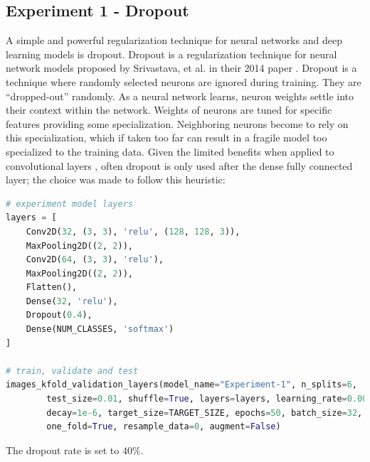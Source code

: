 \documentclass[11pt,a4paper]{article}
\begin{document}
\subsection{Experiment 1 - Dropout}
A simple and powerful regularization technique for neural networks and deep learning models is dropout. Dropout is a regularization technique for neural network models proposed by Srivastava, et al. in their 2014 paper \cite{JMLR:v15:srivastava14a}. Dropout is a technique where randomly selected neurons are ignored during training. They are “dropped-out” randomly. As a neural network learns, neuron weights settle into their context within the network. Weights of neurons are tuned for specific features providing some specialization. Neighboring neurons become to rely on this specialization, which if taken too far can result in a fragile model too specialized to the training data. Given the limited benefits when applied to convolutional layers \cite{DBLP:journals/corr/abs-1810-12890}, often dropout is only used after the dense fully connected layer; the choice was made to follow this heuristic:
\begin{lstlisting}[language=Python,frame=single]
# experiment model layers
layers = [
    Conv2D(32, (3, 3), 'relu', (128, 128, 3)),
    MaxPooling2D((2, 2)),
    Conv2D(64, (3, 3), 'relu'),
    MaxPooling2D((2, 2)),
    Flatten(),
    Dense(32, 'relu'),
    Dropout(0.4),
    Dense(NUM_CLASSES, 'softmax')
]

# train, validate and test
images_kfold_validation_layers(model_name="Experiment-1", n_splits=6,
        test_size=0.01, shuffle=True, layers=layers, learning_rate=0.001,
        decay=1e-6, target_size=TARGET_SIZE, epochs=50, batch_size=32,
        one_fold=True, resample_data=0, augment=False)
\end{lstlisting}
The dropout rate is set to $40\%$.
\end{document}
